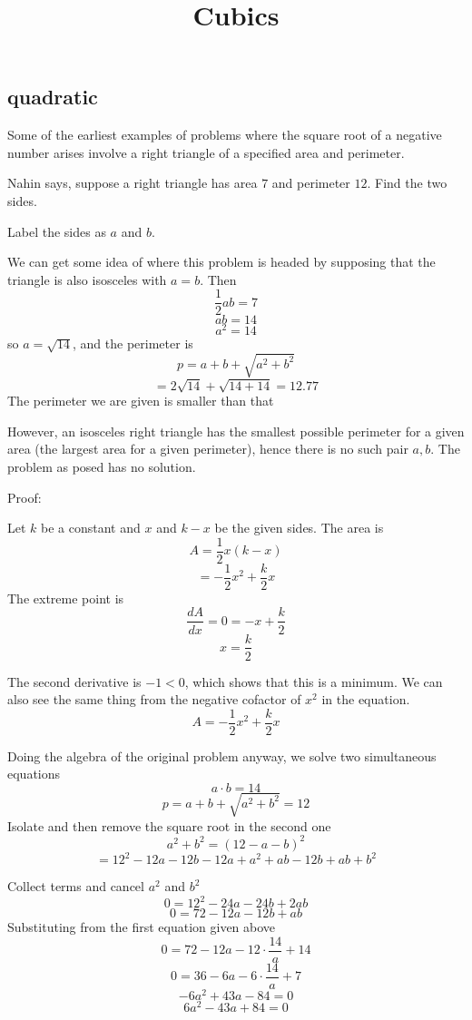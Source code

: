 \documentclass[11pt, oneside]{article}
\title{Cubics}
\date{}
\begin{document}
\maketitle
\Large


\subsection*{quadratic}

Some of the earliest examples of problems where the square root of a negative number arises involve a right triangle of a specified area and perimeter.  

Nahin says, suppose a right triangle has area $7$ and perimeter $12$.  Find the two sides.  

Label the sides as $a$ and $b$.

We can get some idea of where this problem is headed by supposing that the triangle is also isosceles with $a = b$.  Then 
\[ \frac{1}{2} ab = 7 \]
\[ ab = 14 \]
\[ a^2 = 14 \] 
so $a = \sqrt{14}$, and the perimeter is
\[ p = a + b + \sqrt{a^2 + b^2} \]
\[ = 2 \sqrt{14} + \sqrt{14 + 14} = 12.77 \]
The perimeter we are given is smaller than that

However, an isosceles right triangle has the smallest possible perimeter for a given area (the largest area for a given perimeter), hence there is no such pair $a,b$.
The problem as posed has no solution.

Proof:

Let $k$ be a constant and $x$ and $k - x$ be the given sides.  The area is
\[ A = \frac{1}{2} x (k - x) \]
\[ = -\frac{1}{2} x^2 + \frac{k}{2} x \]
The extreme point is
\[ \frac{dA}{dx} = 0 = - x + \frac{k}{2} \]
\[ x = \frac{k}{2} \]

The second derivative is $-1 < 0$, which shows that this is a minimum.  We can also see the same thing from the negative cofactor of $x^2$ in the equation.
\[ A = -\frac{1}{2} x^2 + \frac{k}{2} x \]

Doing the algebra of the original problem anyway, we solve two simultaneous equations
\[ a \cdot b = 14 \]
\[ p = a + b + \sqrt{a^2 + b^2} = 12 \]
Isolate and then remove the square root in the second one
\[ a^2 + b^2 = (12 - a - b)^2 \]
\[ = 12^2 - 12a - 12b - 12a + a^2 + ab - 12b + ab + b^2 \]

Collect terms and cancel $a^2$ and $b^2$
\[ 0 = 12^2 - 24a - 24b + 2ab \]
\[ 0 = 72 - 12a - 12b + ab \]
Substituting from the first equation given above
\[ 0 = 72 - 12a - 12 \cdot \frac{14}{a} + 14 \]
\[ 0 = 36 - 6a - 6 \cdot \frac{14}{a} + 7 \]
\[ -6 a^2 + 43a - 84 = 0 \]
\[ 6 a^2 - 43a + 84 = 0 \]
\end{document}
